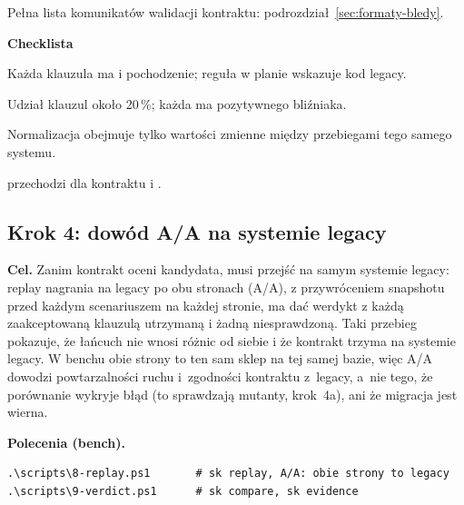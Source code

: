 Pełna lista komunikatów walidacji kontraktu: podrozdział~\ref{sec:formaty-bledy}.

\textbf{Checklista}
\begin{checklista}
  \item Każda klauzula ma  i pochodzenie; reguła w planie wskazuje kod legacy.
  \item Udział klauzul  około 20\,\%; każda ma pozytywnego bliźniaka.
  \item Normalizacja obejmuje tylko wartości zmienne między przebiegami tego samego systemu.
  \item {} przechodzi dla kontraktu i .
\end{checklista}


\subsection{Krok 4: dowód A/A na systemie legacy}\label{sec:procedura-krok4}

\textbf{Cel.} Zanim kontrakt oceni kandydata, musi przejść na samym systemie legacy:
replay nagrania na legacy po obu stronach (A/A), z przywróceniem snapshotu przed każdym
scenariuszem na każdej stronie, ma dać werdykt  z każdą zaakceptowaną
klauzulą utrzymaną i żadną niesprawdzoną. Taki przebieg pokazuje, że łańcuch nie wnosi
różnic od siebie i że kontrakt trzyma na systemie legacy. W benchu obie strony to ten sam
sklep na tej samej bazie, więc A/A dowodzi powtarzalności ruchu i~zgodności kontraktu
z~legacy, a~nie tego, że porównanie wykryje błąd (to sprawdzają mutanty, krok~4a), ani że
migracja jest wierna.

\textbf{Polecenia (bench).}
\begin{lstlisting}
.\scripts\8-replay.ps1       # sk replay, A/A: obie strony to legacy
.\scripts\9-verdict.ps1      # sk compare, sk evidence
\end{lstlisting}

